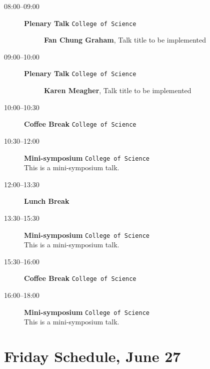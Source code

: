 \documentclass[ILAS2025-program.tex]{subfiles}
\begin{document}
    \begin{description}
    \item[08:00--09:00] \textbf{Plenary Talk} {\footnotesize\texttt{College of Science}}
    \begin{description}
        \item[] \textbf{Fan Chung Graham}, Talk title to be implemented
        \end{description}
        \item[09:00--10:00] \textbf{Plenary Talk} {\footnotesize\texttt{College of Science}}
    \begin{description}
        \item[] \textbf{Karen Meagher}, Talk title to be implemented
        \end{description}
        \item[10:00--10:30] \textbf{Coffee Break} {\footnotesize\texttt{College of Science}}
    \item[10:30--12:00] \textbf{Mini-symposium} {\footnotesize\texttt{College of Science}}
    \\This is a mini-symposium talk.\item[12:00--13:30] \textbf{Lunch Break} {\footnotesize\texttt{}}
    \item[13:30--15:30] \textbf{Mini-symposium} {\footnotesize\texttt{College of Science}}
    \\This is a mini-symposium talk.\item[15:30--16:00] \textbf{Coffee Break} {\footnotesize\texttt{College of Science}}
    \item[16:00--18:00] \textbf{Mini-symposium} {\footnotesize\texttt{College of Science}}
    \\This is a mini-symposium talk.\end{description}
    \newpage

\section{Friday Schedule, June 27}
    
\end{document}
